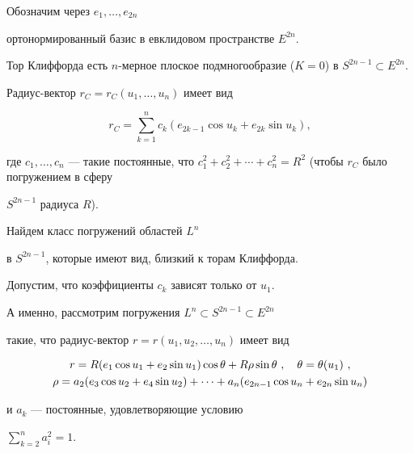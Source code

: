 \label{obrot}





Обозначим через $e_1,\dotsc,e_{2n}$


ортонормированный базис в евклидовом пространстве $E^{2n}$.


Тор Клиффорда есть $n$-мерное плоское подмногообразие ($K=0$) в $S^{2n-1}


\subset E^{2n}$.


Радиус-вектор $r_C = r_C (u_1,\dotsc,u_n)$ имеет вид


\begin{equation}


\label{C-torus}


r_C = \sum_{k=1}^n c_k \left( e_{2k-1} \cos u_k + e_{2k} \sin u_k \right),


\end{equation}


где $c_1,\dotsc,c_n$ --- такие постоянные, что $c_1^2 + c_2^2 + \dotsb


+ c_n^2 = R^2$ (чтобы $r_C$ было погружением в сферу


$S^{2n-1}$ радиуса $R$).


Найдем класс погружений областей $L^n$


в $S^{2n-1}$, которые имеют вид, близкий к торам Клиффорда.


Допустим, что коэффициенты $c_k$ зависят только от $u_1$.


А именно, рассмотрим погружения $L^n \subset S^{2n-1} \subset E^{2n}$


такие, что радиус-вектор $r=r(u_1,u_2,\dotsc,u_n)$ имеет вид


\begin{gather}


r = R (e_1 \cos u_1 + e_2 \sin u_1) \cos\theta + 


R \rho \sin\theta \ , \quad 


\label{gen-Cliff}


\theta=\theta(u_1) \ ,\\


%


\rho = a_2 (e_3 \cos u_2 + e_4 \sin u_2) + \dotsb


+ a_n (e_{2n-1} \cos u_n + e_{2n} \sin u_n)\notag


\end{gather}


и $a_k$ --- постоянные, удовлетворяющие условию


$\sum\limits_{k=2}^n a_i^2 = 1$.


